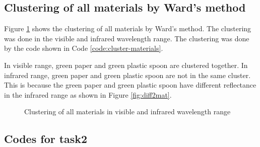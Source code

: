 \subsection{Clustering of all materials by Ward's method}
Figure \ref{fig:clustering} shows the clustering of all materials by
Ward's method. The clustering was done in the visible and infrared
wavelength range. The clustering was done by the code shown in Code
\ref{code:cluster-materials}.

In visible range, green paper and green plastic spoon are clustered
together. In infrared range, green paper and green plastic spoon are
not in the same cluster. This is because the green paper and green
plastic spoon have different reflectance in the infrared range as
shown in Figure \ref{fig:diff2mat}.

\begin{figure}[H] %
  \centering


  \hspace{0.1cm}

  \caption[]{Clustering of all materials in visible and infrared
  wavelength range}
  \label{fig:clustering}
\end{figure}

\subsection{Codes for task2}




